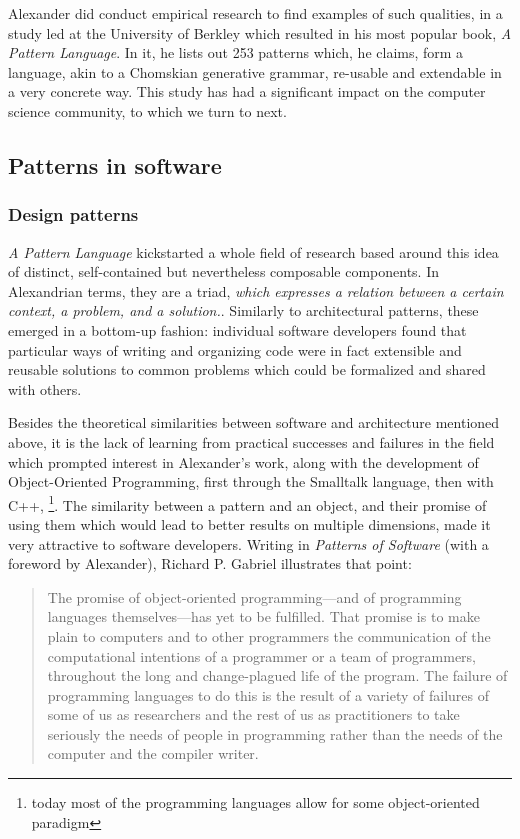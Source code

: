 \documentclass{article}
\begin{document}
Alexander did conduct empirical research to find examples of such qualities, in a study led at the University of Berkley which resulted in his most popular book, \emph{A Pattern Language}\cite{alexander_pattern_1977}. In it, he lists out 253 patterns which, he claims, form a language, akin to a Chomskian generative grammar, re-usable and extendable in a very concrete way. This study has had a significant impact on the computer science community, to which we turn to next.

\vspace{1\baselineskip}

\subsection{Patterns in software}

\subsubsection{Design patterns}

\emph{A Pattern Language} kickstarted a whole field of research based around this idea of distinct, self-contained but nevertheless composable components. In Alexandrian terms, they are a triad, \emph{which expresses a relation between a certain context, a problem, and a solution.}. Similarly to architectural patterns, these emerged in a bottom-up fashion: individual software developers found that particular ways of writing and organizing code were in fact extensible and reusable solutions to common problems which could be formalized and shared with others.

Besides the theoretical similarities between software and architecture mentioned above, it is the lack of learning from practical successes and failures in the field which prompted interest in Alexander's work, along with the development of Object-Oriented Programming, first through the Smalltalk language, then with C++, \footnote{today most of the programming languages allow for some object-oriented paradigm}. The similarity between a pattern and an object, and their promise of using them which would lead to better results on multiple dimensions, made it very attractive to software developers. Writing in \emph{Patterns of Software} (with a foreword by Alexander), Richard P. Gabriel illustrates that point:

\begin{quote}
  The promise of object-oriented programming—and of programming languages themselves—has yet to be fulfilled. That promise is to make plain to computers and to other programmers the communication of the computational intentions of a programmer or a team of programmers, throughout the long and change-plagued life of the program. The failure of programming languages to do this is the result of a variety of failures of some of us as researchers and the rest of us as practitioners to take seriously the needs of people in programming rather than the needs of the computer and the compiler writer.\cite{gabriel_patterns_1998}
\end{quote}
\end{document}
